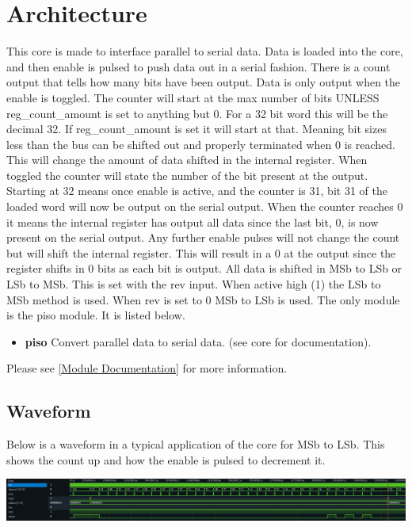 \section{Architecture}
\par
This core is made to interface parallel to serial data. Data is loaded into the core, and then enable is pulsed to
push data out in a serial fashion. There is a count output that tells how many bits have been output. Data is only output
when the enable is toggled. The counter will start at the max number of bits UNLESS reg\_count\_amount is set to anything but 0.
For a 32 bit word this will be the decimal 32. If reg\_count\_amount is set it will start at that. Meaning bit sizes less than the bus
can be shifted out and properly terminated when 0 is reached. This will change the amount of data shifted in the internal register.
When toggled the counter will state the number of the bit present at the output. Starting at 32 means once enable is active,
and the counter is 31, bit 31 of the loaded word will now be output on the serial output. When the counter reaches 0 it means
the internal register has output all data since the last bit, 0, is now present on the serial output. Any further enable
pulses will not change the count but will shift the internal register. This will result in a 0 at the output since the register
shifts in 0 bits as each bit is output. All data is shifted in MSb to LSb or LSb to MSb. This is set with the rev input.
When active high (1) the LSb to MSb method is used. When rev is set to 0 MSb to LSb is used.
The only module is the piso module. It is listed below.

\begin{itemize}
  \item \textbf{piso} Convert parallel data to serial data. (see core for documentation).
\end{itemize}

Please see \ref{Module Documentation} for more information.

\subsection{Waveform}
\par
Below is a waveform in a typical application of the core for MSb to LSb. This shows the count up and how the enable is pulsed to decrement it.

\includegraphics[width=\textwidth]{img/diagrams/waveform_rev0.png}

